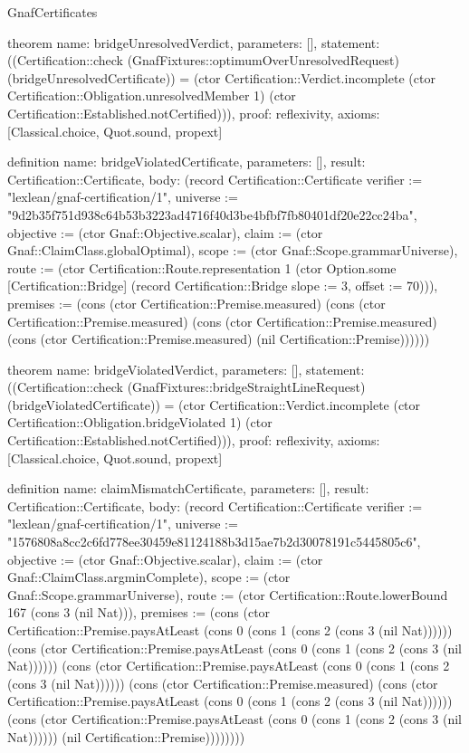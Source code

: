 \begin{lexlean}{GnafCertificates}
\begin{semanticmodule}
theorem{
  name: bridgeUnresolvedVerdict,
  parameters: [],
  statement: ((Certification::check (GnafFixtures::optimumOverUnresolvedRequest) (bridgeUnresolvedCertificate)) = (ctor Certification::Verdict.incomplete (ctor Certification::Obligation.unresolvedMember 1) (ctor Certification::Established.notCertified))),
  proof: reflexivity{},
  axioms: [Classical.choice, Quot.sound, propext]
}

definition{
  name: bridgeViolatedCertificate,
  parameters: [],
  result: Certification::Certificate,
  body: (record Certification::Certificate {verifier := "lexlean/gnaf-certification/1", universe := "9d2b35f751d938c64b53b3223ad4716f40d3be4bfbf7fb80401df20e22cc24ba", objective := (ctor Gnaf::Objective.scalar), claim := (ctor Gnaf::ClaimClass.globalOptimal), scope := (ctor Gnaf::Scope.grammarUniverse), route := (ctor Certification::Route.representation 1 (ctor Option.some [Certification::Bridge] (record Certification::Bridge {slope := 3, offset := 70}))), premises := (cons (ctor Certification::Premise.measured) (cons (ctor Certification::Premise.measured) (cons (ctor Certification::Premise.measured) (cons (ctor Certification::Premise.measured) (nil Certification::Premise)))))})
}

theorem{
  name: bridgeViolatedVerdict,
  parameters: [],
  statement: ((Certification::check (GnafFixtures::bridgeStraightLineRequest) (bridgeViolatedCertificate)) = (ctor Certification::Verdict.incomplete (ctor Certification::Obligation.bridgeViolated 1) (ctor Certification::Established.notCertified))),
  proof: reflexivity{},
  axioms: [Classical.choice, Quot.sound, propext]
}

definition{
  name: claimMismatchCertificate,
  parameters: [],
  result: Certification::Certificate,
  body: (record Certification::Certificate {verifier := "lexlean/gnaf-certification/1", universe := "1576808a8cc2c6fd778ee30459e81124188b3d15ae7b2d30078191c5445805c6", objective := (ctor Gnaf::Objective.scalar), claim := (ctor Gnaf::ClaimClass.argminComplete), scope := (ctor Gnaf::Scope.grammarUniverse), route := (ctor Certification::Route.lowerBound 167 (cons 3 (nil Nat))), premises := (cons (ctor Certification::Premise.paysAtLeast (cons 0 (cons 1 (cons 2 (cons 3 (nil Nat)))))) (cons (ctor Certification::Premise.paysAtLeast (cons 0 (cons 1 (cons 2 (cons 3 (nil Nat)))))) (cons (ctor Certification::Premise.paysAtLeast (cons 0 (cons 1 (cons 2 (cons 3 (nil Nat)))))) (cons (ctor Certification::Premise.measured) (cons (ctor Certification::Premise.paysAtLeast (cons 0 (cons 1 (cons 2 (cons 3 (nil Nat)))))) (cons (ctor Certification::Premise.paysAtLeast (cons 0 (cons 1 (cons 2 (cons 3 (nil Nat)))))) (nil Certification::Premise)))))))})
}


\end{semanticmodule}
\end{lexlean}
